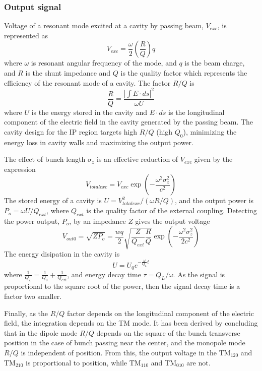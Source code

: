 \subsubsection{Output signal}
Voltage of a resonant mode excited at a cavity by passing beam, $V_{exc}$, is represented as
\begin{equation}
 V_{exc}=\frac{\omega}{2}\left(\frac{R}{Q}\right)q
\end{equation}
where $\omega$ is resonant angular frequency of the mode, and $q$ is the beam charge, and $R$ is the shunt impedance and $Q$ is the quality factor which represents the efficiency of the resonant mode of a cavity. The factor $R/Q$ is
\begin{equation}
 \frac{R}{Q}=\frac{|\int E\cdot ds|^2}{\omega U}
\end{equation}
where $U$ is the energy stored in the cavity and $E\cdot ds$ is the longitudinal component of the electric field in the cavity generated by the passing beam. The cavity design for the IP region targets high $R/Q$ (high $Q_0$), minimizing the energy loss in cavity walls and maximizing the output power.\par
The effect of bunch length $\sigma_z$ is an effective reduction of $V_{exc}$ given by the expression
\begin{equation}
 V_{totalexc}=V_{exc}\exp\left(-\frac{\omega^2\sigma_z^2}{c^2}\right)
\end{equation}
The stored energy of a cavity is $U=V_{totalexc}^2/(\omega R/Q)$, and the output power is $P_o=\omega U/Q_{ext}$, where $Q_{ext}$ is the quality factor of the external coupling. Detecting the power output, $P_o$, by an impedance $Z$ gives the output voltage
\begin{equation}
 V_{out0}=\sqrt{ZP_{o}}=\frac{wq}{2}\sqrt{\frac{Z}{Q_{ext}}\frac{R}{Q}}\exp\left(-\frac{\omega^2\sigma_z^2}{2c^2}\right)
\end{equation}
The energy disipation in the cavity is
\begin{equation}
 U=U_0 e^{-\frac{\omega}{Q_L}t}
\end{equation}
where $\frac{1}{Q_L}=\frac{1}{Q_0}+\frac{1}{Q_{ext}}$, and energy decay time $\tau=Q_L/\omega$. As the signal is proportional to the square root of the power, then the signal decay time is a factor two smaller.\par
Finally, as the $R/Q$ factor depends on the longitudinal component of the electric field, the integration depends on the TM mode. It has been derived by \cite{Nakathese} concluding that in the dipole mode $R/Q$ depends on the square of the bunch transverse position in the case of bunch passing near the center, and the monopole mode $R/Q$ is independent of position. From this, the output voltage in the TM$_{120}$ and TM$_{210}$ is proportional to position, while TM$_{110}$ and TM$_{010}$ are not.\par
